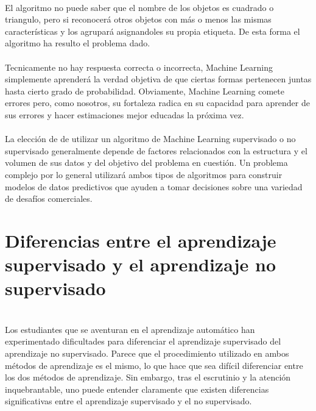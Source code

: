 \documentclass[11pt,a4paper]{article}
\begin{document}
		\\El algoritmo no puede saber que el nombre de los objetos es cuadrado o triangulo, pero si reconocerá otros objetos con más o menos las mismas características y los agrupará asignandoles su propia etiqueta. De esta forma el algoritmo ha resulto el problema dado.\\

        \\Tecnicamente no hay respuesta correcta o incorrecta, Machine Learning simplemente aprenderá la verdad objetiva de que ciertas formas pertenecen juntas hasta cierto grado de probabilidad. Obviamente, Machine Learning comete errores pero, como nosotros, su fortaleza radica en su capacidad para aprender de sus errores y hacer estimaciones mejor educadas la próxima vez.\\

        \\La elección de de utilizar un algoritmo de Machine Learning supervisado o no supervisado generalmente depende de factores relacionados con la estructura y el volumen de sus datos y del objetivo del problema en cuestión. Un problema complejo por lo general utilizará ambos tipos de algoritmos para construir modelos de datos predictivos que ayuden a tomar decisiones sobre una variedad de desafíos comerciales.\\
		
		
		
		
		
		
		\newpage
		\section{Diferencias entre el aprendizaje supervisado y el aprendizaje no supervisado}
		
		\\Los estudiantes que se aventuran en el aprendizaje automático han experimentado dificultades para diferenciar el aprendizaje supervisado del aprendizaje no supervisado. Parece que el procedimiento utilizado en ambos métodos de aprendizaje es el mismo, lo que hace que sea difícil diferenciar entre los dos métodos de aprendizaje. Sin embargo, tras el escrutinio y la atención inquebrantable, uno puede entender claramente que existen diferencias significativas entre el aprendizaje supervisado y el no supervisado.\\
		
\end{document}
